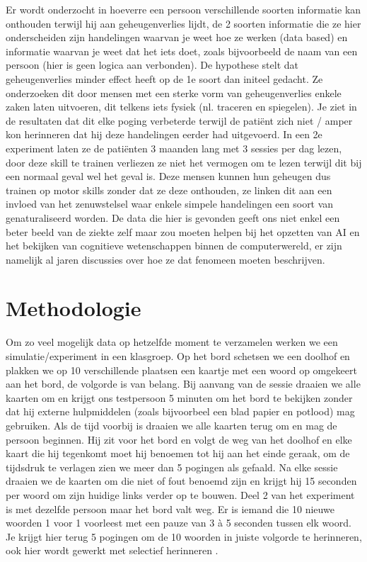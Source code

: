\documentclass{voorstel}
\begin{document}
	Er wordt onderzocht in hoeverre een persoon verschillende soorten informatie kan onthouden terwijl hij aan geheugenverlies lijdt, de 2 soorten informatie die ze hier onderscheiden zijn
	handelingen waarvan je weet hoe ze werken (data based) en informatie waarvan je weet dat het iets doet, zoals bijvoorbeeld de naam van een persoon (hier is geen logica aan verbonden).
	De hypothese stelt dat geheugenverlies minder effect heeft op de 1e soort dan initeel gedacht. Ze onderzoeken dit door mensen met een sterke vorm van geheugenverlies enkele zaken laten
	uitvoeren, dit telkens iets fysiek (nl. traceren en spiegelen). Je ziet in de resultaten dat dit elke poging verbeterde terwijl de patiënt zich niet / amper kon herinneren dat hij deze 
	handelingen eerder had uitgevoerd. In een 2e experiment laten ze de patiënten 3 maanden lang met 3 sessies per dag lezen, door deze skill te trainen verliezen ze niet het vermogen om te
	lezen terwijl dit bij een normaal geval wel het geval is. Deze mensen kunnen hun geheugen dus trainen op motor skills zonder dat ze deze onthouden, ze linken dit aan een invloed van het
	zenuwstelsel waar enkele simpele handelingen een soort van genaturaliseerd worden. De data die hier is gevonden geeft ons niet enkel een beter beeld van de ziekte zelf maar zou moeten
	helpen bij het opzetten van AI en het bekijken van cognitieve wetenschappen binnen de computerwereld, er zijn namelijk al jaren discussies over hoe ze dat fenomeen moeten beschrijven.
	
	
	\section{Methodologie}
	\label{sec:methodologie}
	
	Om zo veel mogelijk data op hetzelfde moment te verzamelen werken we een simulatie/experiment in een klasgroep. Op het bord schetsen we een doolhof en plakken we op 10 verschillende plaatsen een kaartje met een woord op omgekeert aan het bord, de volgorde is van belang. Bij aanvang van de sessie draaien we alle kaarten om en krijgt ons testpersoon 5 minuten om het bord te bekijken zonder dat hij externe hulpmiddelen (zoals bijvoorbeel een blad papier en potlood) mag gebruiken. Als de tijd voorbij is draaien we alle kaarten terug om en mag de persoon beginnen. Hij zit voor het bord en volgt de weg van het doolhof en elke kaart die hij tegenkomt moet hij benoemen tot hij aan het einde geraak, om de tijdsdruk te verlagen zien we meer dan 5 pogingen als gefaald. Na elke sessie draaien we de kaarten om die niet of fout benoemd zijn en krijgt hij 15 seconden per woord om zijn huidige links verder op te bouwen. Deel 2 van het experiment is met dezelfde persoon maar het bord valt weg. Er is iemand die 10 nieuwe woorden 1 voor 1 voorleest met een pauze van 3 à 5 seconden tussen elk woord. Je krijgt hier terug 5 pogingen om de 10 woorden in juiste volgorde te herinneren, ook hier wordt gewerkt met selectief herinneren \autocite{BuschkeFuld1974}.
	
\end{document}
